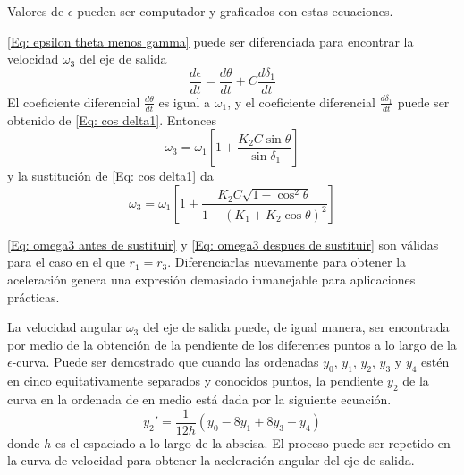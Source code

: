 \documentclass[12pt, final]{extarticle}
\begin{document}
Valores de $\epsilon$ pueden ser computador y graficados con estas ecuaciones.

\eqref{Eq: epsilon theta menos gamma} puede ser diferenciada para encontrar la
velocidad $\omega_{3}$ del eje de salida
\begin{equation*}
    \frac{d\epsilon}{dt} = \frac{d\theta}{dt} + C\frac{d\delta_{1}}{dt}
\end{equation*}
El coeficiente diferencial $\frac{d\theta}{dt}$ es igual a $\omega_{1}$, y el
coeficiente diferencial $\frac{d\delta_{1}}{dt}$ puede ser obtenido de
\eqref{Eq: cos delta1}. Entonces
\begin{equation}
    \omega_{3} = \omega_{1} \left[
        1 + \frac{K_{2}C\sin\theta}{\sin\delta_{1}}
    \right]
    \label{Eq: omega3 antes de sustituir}
\end{equation}
y la sustitución de \eqref{Eq: cos delta1} da
\begin{equation}
    \omega_{3} = \omega_{1} \left[
        1 + \frac{K_{2}C\sqrt{1-\cos^2\theta}}{1-(K_{1} + K_{2}\cos\theta)^2}
    \right]
    \label{Eq: omega3 despues de sustituir}
\end{equation}

\eqref{Eq: omega3 antes de sustituir} y \eqref{Eq: omega3 despues de sustituir}
son válidas para el caso en el que $r_{1} = r_{3}$. Diferenciarlas nuevamente
para obtener la aceleración genera una expresión demasiado inmanejable para
aplicaciones prácticas.

La velocidad angular $\omega_{3}$ del eje de salida puede, de igual manera, ser
encontrada por medio de la obtención de la pendiente de los diferentes puntos a
lo largo de la $\epsilon$-curva. Puede ser demostrado\cite{Milne1949} que
cuando las ordenadas $y_{0}$, $y_{1}$, $y_{2}$, $y_{3}$ y $y_{4}$ estén en cinco
equitativamente separados y conocidos puntos, la pendiente $y_{2}$ de la curva
en la ordenada de en medio está dada por la siguiente ecuación.
\begin{equation}
    {y_{2}}' = \frac{1}{12h}(y_{0} - 8y_{1} + 8y_{3} - y_{4})
\end{equation}
donde $h$ es el espaciado a lo largo de la abscisa. El proceso puede ser
repetido en la curva de velocidad para obtener la aceleración angular del eje de
salida.

\newpage
\end{document}

